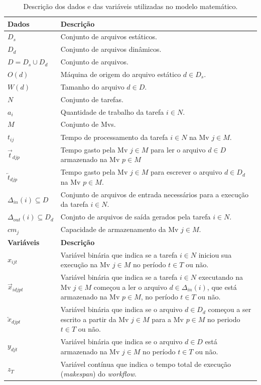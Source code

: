     
\begin{table}[h]
\label{tab:desc}\caption{Descrição dos dados e das variáveis utilizadas no modelo matemático.}
\begin{tabularx}{\textwidth}{|l|X|}
\hline
\textbf{Dados}      & \textbf{Descrição}\\
\hline \hline
	$D_s$           &  Conjunto de arquivos estáticos.\\
	$D_d$           &  Conjunto de arquivos dinâmicos.\\
    $D=D_s\cup D_d$ &  Conjunto de arquivos.\\
    $O(d)$          &  Máquina de origem do arquivo estático $d \in D_s$.\\
    $W(d)$          &  Tamanho do arquivo $d \in D$.\\
    $N$             &  Conjunto de tarefas.\\
    $a_i$           &  Quantidade de trabalho da tarefa $i \in N$.\\
    $M$             &  Conjunto de Mvs.\\
    $t_{ij}$        &  Tempo de processamento da tarefa $i \in N$ na Mv $j \in M$. \\
    $\overrightarrow{t}_{djp}$ & Tempo gasto pela Mv $j \in M$ para ler o arquivo $d \in D$ armazenado na Mv $p \in M$\\
    $\overleftarrow{t}_{djp}$  & Tempo gasto pela Mv $j \in M$ para escrever o arquivo $d \in D_d$ na Mv $p \in M$.\\
    $\Delta_{in}(i) \subseteq D$ & Conjunto de arquivos de entrada necessários para a execução da tarefa $i \in N$.\\
    $\Delta_{out}(i) \subseteq D_d$ & Conjnto de arquivos de saída gerados pela tarefa $i \in N$.\\
    $cm_j$          & Capacidade de armazenamento da Mv $j \in M$.\\
    \hline 
    \hline
\textbf{Variáveis}  & \textbf{Descrição}\\
\hline
\hline
    $x_{ijt}$                    & Variável binária que indica se a tarefa $i \in N $ iniciou sua execução na Mv $j \in M$ no período $t \in T$ ou não.\\
    $\overrightarrow{x}_{idjpt}$ & Variável binária que indica se a tarefa $i \in N $ executando na Mv $j \in M$ começou a ler o arquivo  $d \in \Delta_{in}(i)$, que está armazenado na Mv $p \in M$, no período  $t \in T$ ou não.\\
    $\overleftarrow{x}_{djpt}$   & Variável binária que indica se o arquivo $d \in D_d$ começou a ser escrito a partir da Mv $j \in M$ para a Mv $p \in M$ no periodo $t \in T$ ou não.\\
    $y_{djt}$                    & Variável binária que indica se o arquivo $d \in D$ está armazenado na Mv $j \in M$ no período $t \in T$ ou não.\\
    $z_T$                        & Variável contínua que indica o tempo total de execução (\textit{makespan}) do \textit{workflow}.\\
\hline
\end{tabularx}
\end{table}

